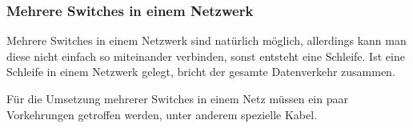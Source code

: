 \subsubsection{Mehrere Switches in einem Netzwerk}
Mehrere Switches in einem Netzwerk sind natürlich möglich, allerdings kann man diese nicht einfach so miteinander verbinden, sonst entsteht eine Schleife.
Ist eine Schleife in einem Netzwerk gelegt, bricht der gesamte Datenverkehr zusammen.

Für die Umsetzung mehrerer Switches in einem Netz müssen ein paar Vorkehrungen getroffen werden, unter anderem spezielle Kabel.



